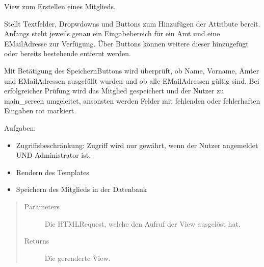 \documentclass[letterpaper,10pt,english]{sphinxmanual}
\begin{document}

\begin{fulllineitems}
\label{\detokenize{masterCodeDoc:mitglieder.views.mitgliedErstellenView}}
View zum Erstellen eines Mitglieds.

Stellt Textfelder, Dropwdowns und Buttons zum Hinzufügen der Attribute bereit. Anfangs steht jeweils genau ein Eingabebereich für ein Amt und eine E\sphinxhyphen{}Mail\sphinxhyphen{}Adresse zur Verfügung. Über Buttons können weitere dieser hinzugefügt oder bereits bestehende entfernt werden.

Mit Betätigung des Speichern\sphinxhyphen{}Buttons wird überprüft, ob Name, Vorname, Ämter und E\sphinxhyphen{}Mail\sphinxhyphen{}Adressen ausgefüllt wurden und ob alle E\sphinxhyphen{}Mail\sphinxhyphen{}Adressen gültig sind. Bei erfolgreicher Prüfung wird das Mitglied gespeichert und der
Nutzer zu main\_screen umgeleitet, ansonsten werden Felder mit fehlenden oder fehlerhaften Eingaben rot markiert.

Aufgaben:
\begin{itemize}
\item {} 
Zugriffsbeschränkung: Zugriff wird nur gewährt, wenn der Nutzer angemeldet UND Administrator ist.

\item {} 
Rendern des Templates

\item {} 
Speichern des Mitglieds in der Datenbank

\end{itemize}
\begin{quote}\begin{description}
\item[{Parameters}] \leavevmode
{} \textendash{} Die HTML\sphinxhyphen{}Request, welche den Aufruf der View ausgelöst hat.

\item[{Returns}] \leavevmode
Die gerenderte View.

\end{description}\end{quote}

\end{fulllineitems}
\end{document}
